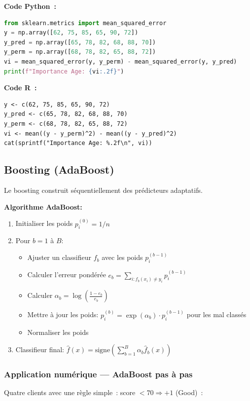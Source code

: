 \documentclass[a4paper,12pt]{article}
\begin{document}
\newpage
\noindent\textbf{Code Python~:}
\begin{lstlisting}[language=Python]
from sklearn.metrics import mean_squared_error
y = np.array([62, 75, 85, 65, 90, 72])
y_pred = np.array([65, 78, 82, 68, 88, 70])
y_perm = np.array([68, 78, 82, 65, 88, 72])
vi = mean_squared_error(y, y_perm) - mean_squared_error(y, y_pred)
print(f"Importance Age: {vi:.2f}")
\end{lstlisting}

\noindent\textbf{Code R~:}
\begin{lstlisting}[]
y <- c(62, 75, 85, 65, 90, 72)
y_pred <- c(65, 78, 82, 68, 88, 70)
y_perm <- c(68, 78, 82, 65, 88, 72)
vi <- mean((y - y_perm)^2) - mean((y - y_pred)^2)
cat(sprintf("Importance Age: %.2f\n", vi))
\end{lstlisting}
\newpage

\subsection{Boosting (AdaBoost)}

Le boosting construit séquentiellement des prédicteurs adaptatifs.

\textbf{Algorithme AdaBoost:}
\begin{enumerate}
  \item Initialiser les poids $p_i^{(0)} = 1/n$
  \item Pour $b = 1$ à $B$:
  \begin{itemize}
    \item Ajuster un classifieur $f_b$ avec les poids $p_i^{(b-1)}$
    \item Calculer l'erreur pondérée $e_b = \sum_{i: f_b(x_i) \neq y_i} p_i^{(b-1)}$
    \item Calculer $\alpha_b = \log\left(\frac{1-e_b}{e_b}\right)$
    \item Mettre à jour les poids: $p_i^{(b)} = \exp(\alpha_b) \cdot p_i^{(b-1)}$ pour les mal classés
    \item Normaliser les poids
  \end{itemize}
  \item Classifieur final: $\hat{f}(x) = \text{signe}\left( \sum_{b=1}^{B} \alpha_b \hat{f}_b(x) \right)$
\end{enumerate}

\subsubsection*{Application numérique — AdaBoost pas à pas}
Quatre clients avec une règle simple~: score $<70 \Rightarrow +1$ (Good)~:
\end{document}
